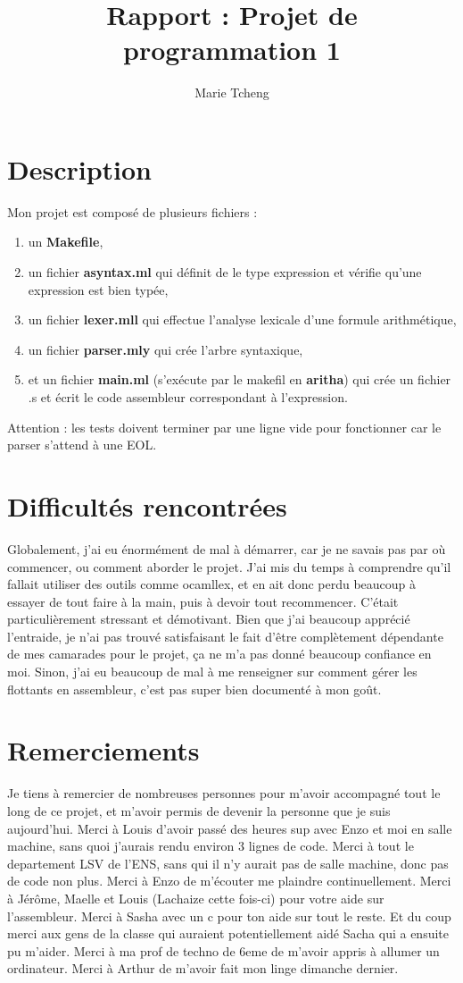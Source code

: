 \documentclass{article}
\title{Rapport : Projet de programmation 1 }
\author{Marie Tcheng }
\begin{document}
\maketitle

\section{Description}
Mon projet est composé de plusieurs fichiers : 
\begin{enumerate}
    \item un \textbf{Makefile},
    \item un fichier \textbf{asyntax.ml} qui définit de le type expression et vérifie qu'une expression est bien typée,
    \item un fichier \textbf{lexer.mll} qui effectue l'analyse lexicale d'une formule arithmétique,
    \item un fichier \textbf{parser.mly} qui crée l'arbre syntaxique,
    \item et un fichier \textbf{main.ml} (s'exécute par le makefil en \textbf{aritha}) qui crée un fichier .s et écrit le code assembleur correspondant à l'expression. 
\end{enumerate}
Attention : les tests doivent terminer par une ligne vide pour fonctionner car le parser s'attend à une EOL. 

\section{Difficultés rencontrées}
Globalement, j'ai eu énormément de mal à démarrer, car je ne savais pas par où commencer, ou comment aborder le projet. 
J'ai mis du temps à comprendre qu'il fallait utiliser des outils comme ocamllex, et en ait donc perdu beaucoup à essayer de tout faire à la main, puis à devoir tout recommencer. 
C'était particulièrement stressant et démotivant. Bien que j'ai beaucoup apprécié l'entraide, je n'ai pas trouvé satisfaisant le fait d'être complètement dépendante de mes camarades pour le projet, ça ne m'a pas donné beaucoup confiance en moi. 
Sinon, j'ai eu beaucoup de mal à me renseigner sur comment gérer les flottants en assembleur, c'est pas super bien documenté à mon goût. 

\section{Remerciements}
Je tiens à remercier de nombreuses personnes pour m'avoir accompagné tout le long de ce projet, et m'avoir permis de devenir la personne que je suis aujourd'hui. 
Merci à Louis d'avoir passé des heures sup avec Enzo et moi en salle machine, sans quoi j'aurais rendu environ 3 lignes de code. 
Merci à tout le departement LSV de l'ENS, sans qui il n'y aurait pas de salle machine, donc pas de code non plus. 
Merci à Enzo de m'écouter me plaindre continuellement.
Merci à Jérôme, Maelle et Louis (Lachaize cette fois-ci) pour votre aide sur l'assembleur. Merci à Sasha avec un c pour ton aide sur tout le reste.
Et du coup merci aux gens de la classe qui auraient potentiellement aidé Sacha qui a ensuite pu m'aider.
Merci à ma prof de techno de 6eme de m'avoir appris à allumer un ordinateur.
Merci à Arthur de m'avoir fait mon linge dimanche dernier. 
\end{document}
